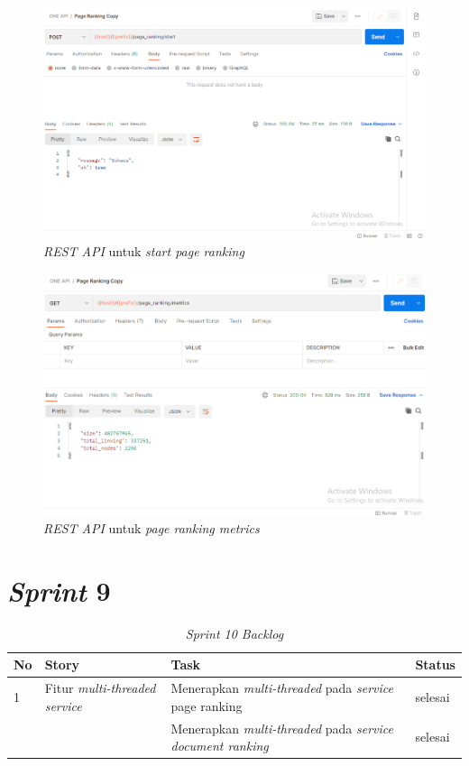 \begin{figure}[H]
	\centering
	\includegraphics[keepaspectratio, width=13cm]{gambar/rest_page_ranking_start.png}
	\caption{\textit{REST API} untuk \textit{start page ranking}}
	\label{gambar:rest_page_ranking_start.png}
\end{figure}


\begin{figure}[H]
	\centering
	\includegraphics[keepaspectratio, width=13cm]{gambar/rest_page_ranking_metrics.png}
	\caption{\textit{REST API} untuk \textit{page ranking metrics}}
	\label{gambar:rest_page_ranking_metrics.png}
\end{figure}

\section{\textit{Sprint} 9}

\begin{longtable}{@{}|p{0.5cm}|p{4cm}|p{6cm}|p{2cm}|@{}}
	\caption{\textit{Sprint 10 Backlog}}\\	
	\hline
	\textbf{No} & \textbf{Story} & \textbf{Task} & \textbf{Status} \\
	\hline
	1 & Fitur \textit{multi-threaded service} & Menerapkan \textit{multi-threaded} pada \textit{service} {page ranking} & selesai \\
	\cline{3-4}
	& & Menerapkan \textit{multi-threaded} pada \textit{service} \textit{document ranking} & selesai \\
	\cline{3-4}
	\hline
	
\end{longtable}

